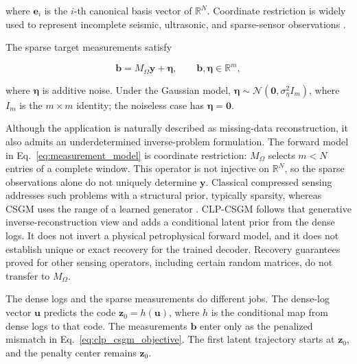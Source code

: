 where $\boldsymbol{e}_i$ is the $i$-th canonical basis vector of
$\mathbb{R}^{N}$. Coordinate restriction is widely used to represent incomplete
seismic, ultrasonic, and sparse-sensor observations
\citep{herrmann2008nonparametric,deAssis2022CompressiveSF,
dasilva2025csshredenhancingshredrobust}.

The sparse target measurements satisfy

\begin{equation}
\boldsymbol{b}
=
M_{\Omega}\boldsymbol{y}
+
\boldsymbol{\eta},
\qquad
\boldsymbol{b},\boldsymbol{\eta}\in\mathbb{R}^{m},
\label{eq:measurement_model}
\end{equation}

where $\boldsymbol{\eta}$ is additive noise. Under the Gaussian model,
$\boldsymbol{\eta}\sim
\mathcal{N}(\boldsymbol{0},\sigma_{\eta}^{2}I_m)$, where $I_m$ is the
$m\times m$ identity; the noiseless case has
$\boldsymbol{\eta}=\boldsymbol{0}$.

Although the application is naturally described as missing-data
reconstruction, it also admits an underdetermined inverse-problem
formulation. The forward model in Eq.~\eqref{eq:measurement_model} is
coordinate restriction: $M_{\Omega}$ selects $m<N$ entries of a complete
window. This operator is not injective on $\mathbb{R}^{N}$, so the sparse
observations alone do not uniquely determine $\boldsymbol{y}$. Classical
compressed sensing addresses such problems with a structural prior, typically
sparsity, whereas CSGM uses the range of a learned generator
\citep{bora2017compressed}. CLP-CSGM follows that generative
inverse-reconstruction view and adds a conditional latent prior from the
dense logs. It does not invert a physical petrophysical forward model, and
it does not establish unique or exact recovery for the trained decoder.
Recovery guarantees proved for other sensing operators, including certain
random matrices, do not transfer to $M_{\Omega}$.

The dense logs and the sparse measurements do different jobs. The dense-log
vector $\boldsymbol{u}$ predicts the code
$\boldsymbol{z}_0=h(\boldsymbol{u})$, where $h$ is the conditional map from
dense logs to that code. The measurements $\boldsymbol{b}$ enter
only as the penalized mismatch in Eq.~\eqref{eq:clp_csgm_objective}.
The first latent trajectory starts at $\boldsymbol{z}_0$, and the penalty
center remains $\boldsymbol{z}_0$.



